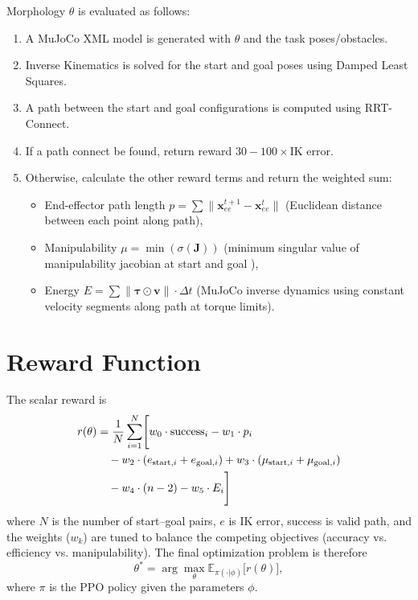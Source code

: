 \documentclass[defaultstyle,11pt]{thesis}
\begin{document}
Morphology $\theta$ is evaluated as follows:
\begin{enumerate}
    \item A MuJoCo XML model is generated with $\theta$ and the task poses/obstacles.
    \item Inverse Kinematics is solved for the start and goal poses using Damped Least Squares.
    \item A path between the start and goal configurations is computed using RRT-Connect.
    \item If a path connect be found, return reward $30 - 100 \times \text{IK error}$.
    \item Otherwise, calculate the other reward terms and return the weighted sum:
    \begin{itemize}
        \item End-effector path length $p = \sum \|\mathbf{x}_{ee}^{t+1} - \mathbf{x}_{ee}^t\|$ (Euclidean distance between each point along path),
        \item Manipulability $\mu = \min(\sigma(\mathbf{J}))$ (minimum singular value of manipulability jacobian at start and goal \cite{klein1987dexterity}),
        \item Energy $E = \sum \|\boldsymbol{\tau} \odot \mathbf{v}\| \cdot \Delta t$ (MuJoCo inverse dynamics using constant velocity segments along path at torque limits).
    \end{itemize}
\end{enumerate}

\section{Reward Function}

The scalar reward is
\begin{align}
r(\theta) &= \frac{1}{N} \sum_{i=1}^{N} \Biggl[ 
    w_0 \cdot \text{success}_i 
    - w_1 \cdot p_i \notag \\
    &\quad - w_2 \cdot (e_{\text{start},i} + e_{\text{goal},i}) 
    + w_3 \cdot (\mu_{\text{start},i} + \mu_{\text{goal},i}) \notag \\
    &\quad - w_4 \cdot (n - 2) 
    - w_5 \cdot E_i 
\Biggr]
\label{eq:reward}
\end{align}
where $N$ is the number of start–goal pairs, $e$ is IK error, success is valid path, and the weights ($w_k$) are tuned to balance the competing objectives (accuracy vs. efficiency vs. manipulability). 
The final optimization problem is therefore
\[
\theta^* = \arg\max_{\theta} \mathbb{E}_{\pi(\cdot|\phi)} \bigl[ r(\theta) \bigr],
\]
where $\pi$ is the PPO policy given the parameters $\phi$.
\end{document}

